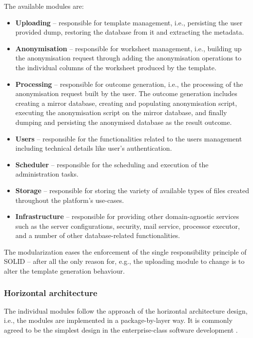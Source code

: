 \documentclass[a4paper,twoside,12pt]{book}
\begin{document}
The available modules are:
\begin{itemize}
\item \textbf{Uploading} -- responsible for template management, i.e., persisting the user provided dump, restoring the database from it and extracting the metadata.
\item \textbf{Anonymisation} -- responsible for worksheet management, i.e., building up the anonymisation request through adding the anonymisation operations to the individual columns of the worksheet produced by the template.
\item \textbf{Processing} -- responsible for outcome generation, i.e., the processing of the anonymisation request built by the user. The outcome generation includes creating a mirror database, creating and populating anonymisation script, executing the anonymisation script on the mirror database, and finally dumping and persisting the anonymised database as the result outcome.
\item \textbf{Users} -- responsible for the functionalities related to the users management including technical details like user's authentication.
\item \textbf{Scheduler} -- responsible for the scheduling and execution of the administration tasks.
\item \textbf{Storage} -- responsible for storing the variety of available types of files created throughout the platform's use-cases.
\item \textbf{Infrastructure} -- responsible for providing other domain-agnostic services such as the server configurations, security, mail service, processor executor, and a number of other database-related functionalities.

\end{itemize}

The modularization eases the enforcement of the single responsibility principle of SOLID \cite{bib:clean_code} -- after all the only reason for, e.g., the uploading module to change is to alter the template generation behaviour.

\subsubsection{Horizontal architecture}

The individual modules follow the approach of the horizontal architecture design, i.e., the modules are implemented in a package-by-layer way. It is commonly agreed to be the simplest design in the enterprise-class software development \cite{bib:fowler}.
\end{document}
